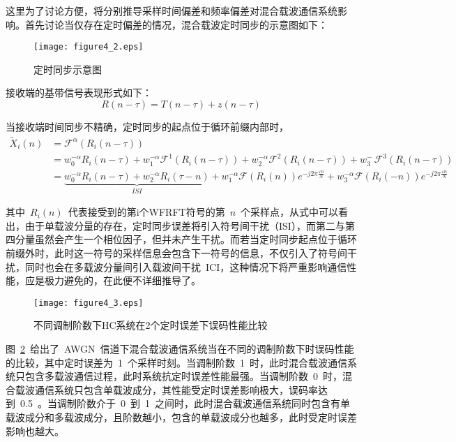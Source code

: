 这里为了讨论方便，将分别推导采样时间偏差和频率偏差对混合载波通信系统影响。首先讨论当仅存在定时偏差的情况，混合载波定时同步的示意图如下：
\begin{figure}[htbp]
\centering
\texttt{[image: figure4\_2.eps]}
\caption{定时同步示意图}\vspace{-1em}\label{dingshitongbuweizhi}
\end{figure}

接收端的基带信号表现形式如下：
\begin{equation}
R(n-\tau) = T(n-\tau) + z(n-\tau)
\end{equation}

当接收端时间同步不精确，定时同步的起点位于循环前缀内部时，
\begin{align}\label{huajianjieguo}
\tilde X_i(n) &= {\mathcal{F}^\alpha }\left ( R_i\left ( n-\tau \right ) \right ) \\
&= w_0^{- \alpha }R_i(n-\tau) + w_1^{- \alpha }{{\mathcal{F}^1}\left ( R_i\left ( n-\tau \right ) \right )}
+ w_2^{- \alpha }{{\mathcal{F}^2}\left ( R_i\left ( n-\tau \right ) \right )}
+ w_3^{- \ }{{\mathcal{F}^3}\left ( R_i\left ( n-\tau \right ) \right )} \\
&= \underbrace {w_0^{- \alpha }R_i(n-\tau) + w_2^{- \alpha }R_i(\tau -n)}_{ISI} + w_1^{- \alpha }{{\mathcal{F}}\left ( R_i\left ( n \right ) \right )} {e^{-j2\pi \frac{{\varepsilon n}}{N}}} + w_3^{- \alpha }{{\mathcal{F}}\left ( R_i\left ( -n \right ) \right )} {e^{-j2\pi \frac{{\varepsilon n}}{N}}}
\end{align}

其中~$R_i(n)$~代表接受到的第i个WFRFT符号的第~$n$~个采样点，从式中可以看出，由于单载波分量的存在，定时同步误差将引入符号间干扰（ISI），而第二与第四分量虽然会产生一个相位因子，但并未产生干扰。而若当定时同步起点位于循环前缀外时，此时这一符号的采样信息会包含下一符号的信息，不仅引入了符号间干扰，同时也会在多载波分量间引入载波间干扰~ICI，这种情况下将严重影响通信性能，应是极力避免的，在此便不详细推导了。
\begin{figure}[htbp]
\centering
\texttt{[image: figure4\_3.eps]}
\caption{不同调制阶数下HC系统在2个定时误差下误码性能比较}\vspace{-1em}\label{dingshiwuma}
\end{figure}
图~\ref{dingshiwuma}~给出了~AWGN~信道下混合载波通信系统当在不同的调制阶数下时误码性能的比较，其中定时误差为~1~个采样时刻。当调制阶数~1~时，此时混合载波通信系统只包含多载波通信过程，此时系统抗定时误差性能最强。当调制阶数~0~时，混合载波通信系统只包含单载波成分，其性能受定时误差影响极大，误码率达到~0.5~。当调制阶数介于~0~到~1~之间时，此时混合载波通信系统同时包含有单载波成分和多载波成分，且阶数越小，包含的单载波成分也越多，此时受定时误差影响也越大。


